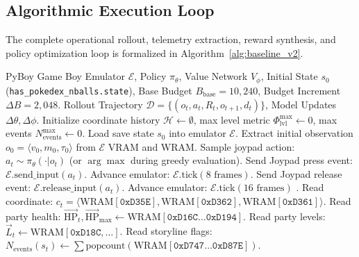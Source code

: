 \documentclass[conference]{IEEEtran}
\begin{document}
\subsection{Algorithmic Execution Loop}
The complete operational rollout, telemetry extraction, reward synthesis, and policy optimization loop is formalized in Algorithm~\ref{alg:baseline_v2}.

\begin{algorithm}[t]
\caption{Baseline V2 Joypad-Cadence Rollout and Composite Reward Execution Engine}
\label{alg:baseline_v2}
\footnotesize
\begin{algorithmic}[1]
\REQUIRE PyBoy Game Boy Emulator $\mathcal{E}$, Policy $\pi_\theta$, Value Network $V_\phi$, Initial State $s_0$ (\texttt{has\_pokedex\_nballs.state}), Base Budget $B_{\text{base}} = 10{,}240$, Budget Increment $\Delta B = 2{,}048$.
\ENSURE Rollout Trajectory $\mathcal{D} = \{ (o_t, a_t, R_t, o_{t+1}, d_t) \}$, Model Updates $\Delta \theta, \Delta \phi$.
\STATE Initialize coordinate history $\mathcal{H} \leftarrow \emptyset$, max level metric $\Phi_{\text{lvl}}^{\max} \leftarrow 0$, max events $N_{\text{events}}^{\max} \leftarrow 0$.
\STATE Load save state $s_0$ into emulator $\mathcal{E}$.
\STATE Extract initial observation $o_0 = \langle v_0, m_0, \tau_0 \rangle$ from $\mathcal{E}$ VRAM and WRAM.
    \STATE Sample joypad action: $a_t \sim \pi_\theta(\cdot | o_t)$ (or $\arg\max$ during greedy evaluation).
    \STATE {}
    \STATE Send Joypad press event: $\mathcal{E}.\text{send\_input}(a_t)$.
    \STATE Advance emulator: $\mathcal{E}.\text{tick}(8\text{ frames})$.
    \STATE Send Joypad release event: $\mathcal{E}.\text{release\_input}(a_t)$.
    \STATE Advance emulator: $\mathcal{E}.\text{tick}(16\text{ frames})$ .
    \STATE {}
    \STATE Read coordinate: $c_t = \langle \text{WRAM}[\texttt{0xD35E}], \text{WRAM}[\texttt{0xD362}], \text{WRAM}[\texttt{0xD361}] \rangle$.
    \STATE Read party health: $\vec{\text{HP}}_t, \vec{\text{HP}}_{\max} \leftarrow \text{WRAM}[\texttt{0xD16C}\dots\texttt{0xD194}]$.
    \STATE Read party levels: $\vec{L}_t \leftarrow \text{WRAM}[\texttt{0xD18C}, \dots]$.
    \STATE Read storyline flags: $N_{\text{events}}(s_t) \leftarrow \sum \text{popcount}(\text{WRAM}[\texttt{0xD747}\dots\texttt{0xD87E}])$.
    \STATE {}

\end{algorithmic}
\end{algorithm}
\end{document}
